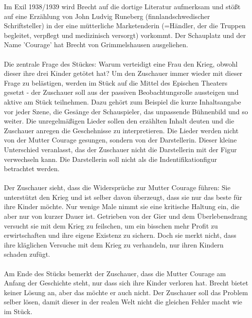 \documentclass[a4paper]{article}
\begin{document}
        Im Exil 1938/1939 wird Brecht auf die dortige Literatur aufmerksam und stößt auf eine Erzählung von John Ludvig Runeberg (finnlandschwedischer Schriftsteller) in der eine mütterliche Marketenderin (=Händler, der die Truppen begleitet, verpflegt und medizinisch versorgt) vorkommt. Der Schauplatz und der Name 'Courage' hat Brecht von Grimmelshausen ausgeliehen.\\\\
Die zentrale Frage des Stückes: Warum verteidigt eine Frau den Krieg, obwohl dieser ihre drei Kinder getötet hat? Um den Zuschauer immer wieder mit dieser Frage zu belästigen, werden im Stück auf die Mittel des Epischen Theaters gesetzt - der Zuschauer soll aus der passiven Beobachtungsrolle aussteigen und aktive am Stück teilnehmen. Dazu gehört zum Beispiel die kurze Inhaltsangabe vor jeder Szene, die Gesänge der Schauspieler, das unpassende Bühnenbild und so weiter. Die unregelmäßigen Lieder sollen den erzählten Inhalt deuten und die Zuschauer anregen die Geschehnisse zu interpretieren. Die Lieder werden nicht von der Mutter Courage gesungen, sondern von der Darstellerin. Dieser kleine Unterschied veranlasst, das der Zuschauer nicht die Darstellerin mit der Figur verwechseln kann. Die Darstellerin soll nicht als die Indentifikationfigur betrachtet werden.\\\\
Der Zuschauer sieht, dass die Widersprüche zur Mutter Courage führen: Sie unterstützt den Krieg und ist selber davon überzeugt, dass sie nur das beste für ihre Kinder möchte. Nur wenige Male nimmt sie eine kritische Haltung ein, die aber nur von kurzer Dauer ist. Getrieben von der Gier und dem Überlebensdrang versucht sie mit dem Krieg zu feilschen, um ein bisschen mehr Profit zu erwirtschaften und ihre eigene Existenz zu sichern. Doch sie merkt nicht, dass ihre kläglichen Versuche mit dem Krieg zu verhandeln, nur ihren Kindern schaden zufügt.\\\\
Am Ende des Stücks bemerkt der Zuschauer, dass die Mutter Courage am Anfang der Geschichte steht, nur dass sich ihre Kinder verloren hat. Brecht bietet keiner Lösung an, aber das möchte er auch nicht. Der Zuschauer soll das Problem selber lösen, damit dieser in der realen Welt nicht die gleichen Fehler macht wie im Stück.
\end{document}
